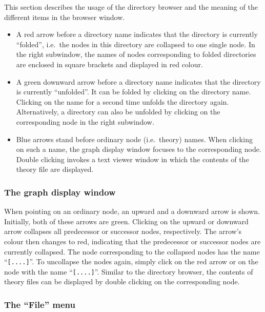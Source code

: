 This section describes the usage of the directory browser and the
meaning of the different items in the browser window.
\begin{itemize}
  
\item A red arrow before a directory name indicates that the directory
  is currently ``folded'', i.e.~the nodes in this directory are
  collapsed to one single node. In the right subwindow, the names of
  nodes corresponding to folded directories are enclosed in square
  brackets and displayed in red colour.
  
\item A green downward arrow before a directory name indicates that
  the directory is currently ``unfolded''. It can be folded by
  clicking on the directory name.  Clicking on the name for a second
  time unfolds the directory again.  Alternatively, a directory can
  also be unfolded by clicking on the corresponding node in the right
  subwindow.
  
\item Blue arrows stand before ordinary node (i.e.~theory) names. When
  clicking on such a name, the graph display window focuses to the
  corresponding node. Double clicking invokes a text viewer window in
  which the contents of the theory file are displayed.

\end{itemize}


\subsubsection*{The graph display window}

When pointing on an ordinary node, an upward and a downward arrow is
shown.  Initially, both of these arrows are green. Clicking on the
upward or downward arrow collapses all predecessor or successor nodes,
respectively. The arrow's colour then changes to red, indicating that
the predecessor or successor nodes are currently collapsed. The node
corresponding to the collapsed nodes has the name ``{\tt [....]}''. To
uncollapse the nodes again, simply click on the red arrow or on the
node with the name ``{\tt [....]}''. Similar to the directory browser,
the contents of theory files can be displayed by double clicking on
the corresponding node.


\subsubsection*{The ``File'' menu}

